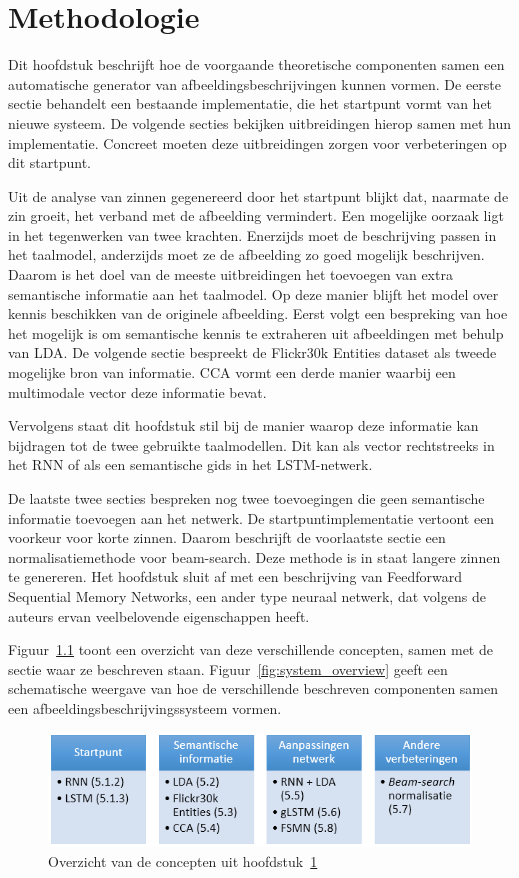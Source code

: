 \chapter{Methodologie}
\label{hst-meth}
Dit hoofdstuk beschrijft hoe de voorgaande theoretische componenten samen een automatische generator van afbeeldingsbeschrijvingen kunnen vormen. De eerste sectie behandelt een bestaande implementatie, die het startpunt vormt van het nieuwe systeem. De volgende secties bekijken uitbreidingen hierop samen met hun implementatie. Concreet moeten deze uitbreidingen zorgen voor verbeteringen op dit startpunt.

Uit de analyse van zinnen gegenereerd door het startpunt blijkt dat, naarmate de zin groeit, het verband met de afbeelding vermindert. Een mogelijke oorzaak ligt in het tegenwerken van twee krachten. Enerzijds moet de beschrijving passen in het taalmodel, anderzijds moet ze de afbeelding zo goed mogelijk beschrijven. Daarom is het doel van de meeste uitbreidingen het toevoegen van extra semantische informatie aan het taalmodel. Op deze manier blijft het model over kennis beschikken van de originele afbeelding. Eerst volgt een bespreking van hoe het mogelijk is om semantische kennis te extraheren uit afbeeldingen met behulp van LDA. De volgende sectie bespreekt de Flickr30k Entities dataset als tweede mogelijke bron van informatie. CCA vormt een derde manier waarbij een multimodale vector deze informatie bevat.

Vervolgens staat dit hoofdstuk stil bij de manier waarop deze informatie kan bijdragen tot de twee gebruikte taalmodellen. Dit kan als vector rechtstreeks in het RNN of als een semantische gids in het LSTM-netwerk. 

De laatste twee secties bespreken nog twee toevoegingen die geen semantische informatie toevoegen aan het netwerk. De startpuntimplementatie vertoont een voorkeur voor korte zinnen. Daarom beschrijft de voorlaatste sectie een normalisatiemethode voor beam-search. Deze methode is in staat langere zinnen te genereren. Het hoofdstuk sluit af met een beschrijving van Feedforward Sequential Memory Networks, een ander type neuraal netwerk, dat volgens de auteurs ervan veelbelovende eigenschappen heeft.

Figuur~\ref{fig:methodology_overview} toont een overzicht van deze verschillende concepten, samen met de sectie waar ze beschreven staan. Figuur~\ref{fig:system_overview} geeft een schematische weergave van hoe de verschillende beschreven componenten samen een afbeeldingsbeschrijvingssysteem vormen.
\begin{figure}
\centering
\includegraphics[width=\linewidth]{Images/methodology_overview}
\caption{Overzicht van de concepten uit hoofdstuk~\ref{hst-meth}}
\label{fig:methodology_overview}
\end{figure}

